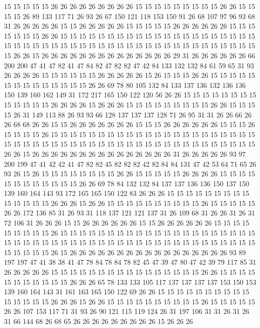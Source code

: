 15 15 15 15 15 26 26 26 26 26 26 26 26 26 15 15 15 15 15 15
15 15 15 26 26 15 15 15 15 26 89 133 117 71 26 93 26 67 150 121
118 153 150 91 26 68 107 97 96 93 68 31 26 26 26 26 26 15 15 26
26 26 26 26 15 15 15 15 15 26 26 26 26 26 26 15 15 15 15 15
15 15 26 26 15 15 15 15 15 15 15 15 15 15 15 15 15 15 15 15
15 15 15 15 15 15 15 15 15 15 15 15 15 15 15 15 15 15 15 15
15 15 15 15 15 15 15 15 15 15 15 15 15 26 26 15 26 26 26 26
26 26 26 26 26 26 26 26 26 26 29 31 26 26 26 26 26 26 66 200
200 47 41 47 82 41 47 84 82 47 82 82 47 42 84 133 132 132 84 61
59 65 31 93 26 26 26 26 15 15 15 15 15 15 26 26 26 26 26 15
26 15 15 15 26 26 15 15 15 15 15 15 15 15 15 15 15 15 15 15
26 26 69 78 80 105 132 84 133 137 136 132 136 136 150 139 160 162 149 31
172 217 165 150 122 120 56 26 26 15 15 15 15 15 15 15 15 15 15 15
15 15 26 26 26 26 15 26 26 26 15 15 15 15 15 15 15 15 15 26
26 15 15 15 15 26 31 149 113 88 26 93 93 66 128 137 137 137 128 71
26 95 31 31 26 26 66 26 26 68 68 26 26 15 15 26 26 26 26 26
26 26 15 15 15 26 26 26 26 26 26 15 15 15 26 15 15 15 15 26
15 15 15 15 15 15 15 15 15 15 15 15 15 15 15 15 15 15 15 15
15 15 15 15 15 15 15 15 15 15 15 15 15 15 15 15 15 15 15 15
15 15 15 15 15 15 15 15 15 26 26 15 26 26 26 26 26 26 26 26
26 26 26 26 26 26 26 31 26 26 26 26 26 93 97 200 199 47 41 42
42 41 47 82 82 45 82 82 82 42 82 84 84 131 47 42 53 64 71 65
26 93 26 15 26 15 15 15 15 15 15 15 15 26 26 15 15 15 15 15
26 26 26 26 15 15 15 15 15 15 15 15 15 15 15 15 26 26 69 78
84 132 132 84 137 137 136 136 150 137 150 139 160 164 143 93 172 165 165 150
122 83 26 26 26 15 15 15 15 15 15 15 15 15 15 15 15 15 15 26
26 26 15 26 26 15 15 15 15 15 15 15 15 15 15 26 15 15 15 15
15 26 26 172 136 85 31 26 93 31 118 137 121 121 137 31 26 109 68 31
26 26 31 26 31 72 106 31 26 26 26 15 15 26 26 26 26 26 26 15
15 26 26 26 26 26 26 15 15 15 15 15 15 15 15 15 26 15 15 15
15 15 15 15 15 15 15 15 15 15 15 15 15 15 15 15 15 15 15 15
15 15 15 15 15 15 15 15 15 15 15 15 15 15 15 15 15 15 15 15
15 15 15 15 15 15 15 15 15 15 26 15 26 26 26 26 26 26 26 26
26 26 26 26 26 26 26 26 26 93 89 197 197 47 41 38 38 41 47 78
84 78 84 78 82 45 47 39 47 80 47 42 39 79 117 85 31 26 26 26
26 26 15 15 15 15 15 15 15 15 15 15 15 15 15 15 15 15 26 26
15 15 15 15 15 15 15 15 15 15 15 26 26 26 65 78 133 133 105 117
137 137 137 137 153 150 153 139 160 164 143 31 161 163 165 150 122 69 26 26
15 15 15 15 15 15 15 15 15 15 15 15 15 15 15 26 26 26 15 26
26 15 15 15 15 15 15 15 15 15 15 26 15 15 15 15 15 26 26 107
153 117 71 31 93 26 90 121 115 119 124 26 31 197 106 31 31 26 31 26
31 66 144 68 26 68 65 26 26 26 26 26 26 26 26 26 15 26 26 26
